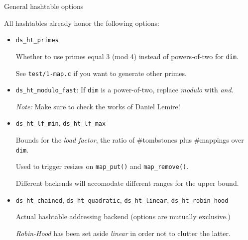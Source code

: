 \begin{frame}[fragile]{General hashtable options}

  All hashtables already honor the following options:
  \begin{itemize}

  \item \lstinline{ds_ht_primes}

    Whether to use primes equal 3 (mod 4) instead of powers-of-two for \lstinline{dim}.

    See \lstinline{test/1-map.c} if you want to generate other primes.
    
  \item \lstinline{ds_ht_modulo_fast}: If \lstinline{dim} is a power-of-two, replace {\em modulo} with {\em and}.

    {\em Note:} Make sure to check the works of Daniel Lemire!

  \item \lstinline{ds_ht_lf_min}, \lstinline{ds_ht_lf_max}

    Bounds for the {\em load factor}, the ratio of \#tombstones plus \#mappings over \lstinline{dim}.

    Used to trigger resizes on \lstinline{map_put()} and \lstinline{map_remove()}.

    Different backends will accomodate different ranges for the upper bound.

  \item \lstinline{ds_ht_chained}, \lstinline{ds_ht_quadratic}, \lstinline{ds_ht_linear}, \lstinline{ds_ht_robin_hood}

    Actual hashtable addressing backend (options are mutually exclusive.)

    {\em Robin-Hood} has been set aside {\em linear} in order not to clutter the latter.

  \end{itemize}

\end{frame}


